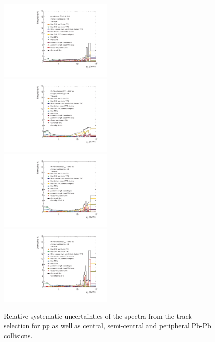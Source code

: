 \documentclass[12pt,a4paper]{report}
\begin{document}
\begin{figure}[H]
\centering
\includegraphics[width=0.495\textwidth]{Plots/SysUncpp.pdf}  
\includegraphics[width=0.495\textwidth]{Plots/SysUncPbPbcent.pdf}  
\includegraphics[width=0.495\textwidth]{Plots/SysUncPbPbsemi.pdf}  
\includegraphics[width=0.495\textwidth]{Plots/SysUncPbPbperi.pdf}  
\caption{Relative systematic uncertainties of the \pt spectra from the track selection for pp as well as central, semi-central and peripheral Pb-Pb collisions.}
\label{SysUncSpec}
\end{figure}
\end{document}
